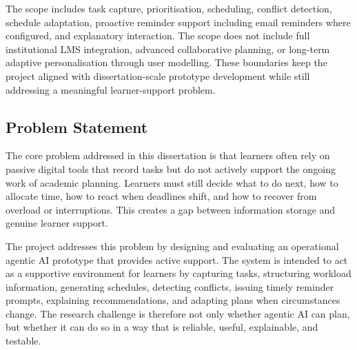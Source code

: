 \documentclass[12pt]{article}
\begin{document}
The scope includes task capture, prioritisation, scheduling, conflict detection, schedule adaptation, proactive reminder support including email reminders where configured, and explanatory interaction. The scope does not include full institutional LMS integration, advanced collaborative planning, or long-term adaptive personalisation through user modelling. These boundaries keep the project aligned with dissertation-scale prototype development while still addressing a meaningful learner-support problem.
\subsection{Problem Statement}
The core problem addressed in this dissertation is that learners often rely on passive digital tools that record tasks but do not actively support the ongoing work of academic planning. Learners must still decide what to do next, how to allocate time, how to react when deadlines shift, and how to recover from overload or interruptions. This creates a gap between information storage and genuine learner support.

The project addresses this problem by designing and evaluating an operational agentic AI prototype that provides active support. The system is intended to act as a supportive environment for learners by capturing tasks, structuring workload information, generating schedules, detecting conflicts, issuing timely reminder prompts, explaining recommendations, and adapting plans when circumstances change. The research challenge is therefore not only whether agentic AI can plan, but whether it can do so in a way that is reliable, useful, explainable, and testable.
\end{document}
